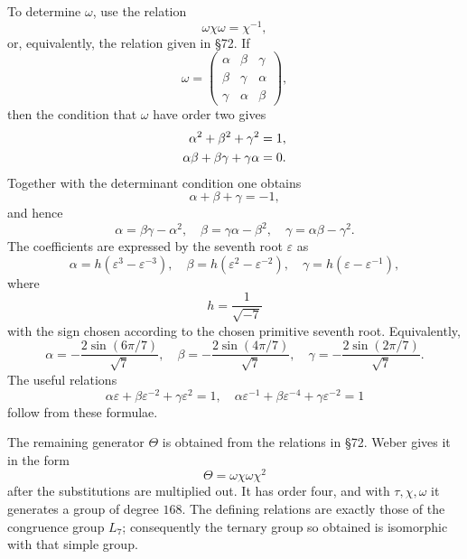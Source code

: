 \documentclass[12pt,a4paper]{article}
\begin{document}
To determine $\omega$, use the relation
\begin{equation}
 \omega\chi\omega=\chi^{-1},
\end{equation}
or, equivalently, the relation given in \S 72.  If
\begin{equation}
 \omega=\begin{pmatrix}
 \alpha&\beta&\gamma\\
 \beta&\gamma&\alpha\\
 \gamma&\alpha&\beta
 \end{pmatrix},
\end{equation}
then the condition that $\omega$ have order two gives
\begin{align}
 \alpha^2+\beta^2+\gamma^2&=1,\notag\\
 \alpha\beta+\beta\gamma+\gamma\alpha&=0.
\end{align}
Together with the determinant condition one obtains
\begin{equation}
 \alpha+\beta+\gamma=-1,
\end{equation}
and hence
\begin{equation}
 \alpha=\beta\gamma-\alpha^2,
 \quad
 \beta=\gamma\alpha-\beta^2,
 \quad
 \gamma=\alpha\beta-\gamma^2.
\end{equation}
The coefficients are expressed by the seventh root $\varepsilon$ as
\begin{equation}
 \alpha=h(\varepsilon^3-\varepsilon^{-3}),
 \quad
 \beta=h(\varepsilon^2-\varepsilon^{-2}),
 \quad
 \gamma=h(\varepsilon-\varepsilon^{-1}),
\end{equation}
where
\begin{equation}
 h=\frac{1}{\sqrt{-7}}
\end{equation}
with the sign chosen according to the chosen primitive seventh root.  Equivalently,
\begin{equation}
 \alpha=-\frac{2\sin(6\pi/7)}{\sqrt7},
 \quad
 \beta=-\frac{2\sin(4\pi/7)}{\sqrt7},
 \quad
 \gamma=-\frac{2\sin(2\pi/7)}{\sqrt7}.
\end{equation}
The useful relations
\begin{equation}
 \alpha\varepsilon+\beta\varepsilon^{-2}+\gamma\varepsilon^2=1,
 \quad
 \alpha\varepsilon^{-1}+\beta\varepsilon^{-4}+\gamma\varepsilon^{-2}=1
\end{equation}
follow from these formulae.

The remaining generator $\Theta$ is obtained from the relations in \S 72.  Weber gives it in the form
\begin{equation}
 \Theta=\omega\chi\omega\chi^2
\end{equation}
after the substitutions are multiplied out.  It has order four, and with $\tau,
\chi,
\omega$ it generates a group of degree $168$.  The defining relations are exactly those of the congruence group $L_7$; consequently the ternary group so obtained is isomorphic with that simple group.
\end{document}
